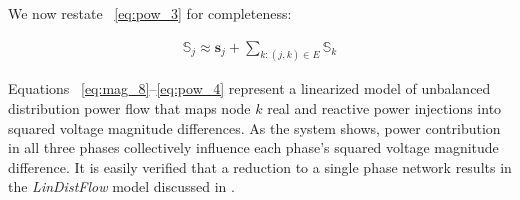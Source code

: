 We now restate ~\eqref{eq:pow_3} for completeness:

\begin{align}
	\mathbb{S}_{j} \approx \mathbf{s}_{j} + \sum_{k:(j,k) \in E} \mathbb{S}_{k} \label{eq:pow_4}
\end{align}

Equations ~\eqref{eq:mag_8}--\eqref{eq:pow_4} represent a linearized model of unbalanced distribution power flow that maps node $k$ real and reactive power injections into squared voltage magnitude differences. As the system shows, power contribution in all three phases collectively influence each phase's squared voltage magnitude difference.  It is easily verified that a reduction to a single phase network results in the \emph{LinDistFlow} model discussed in \cite{baran1989optimal}.

